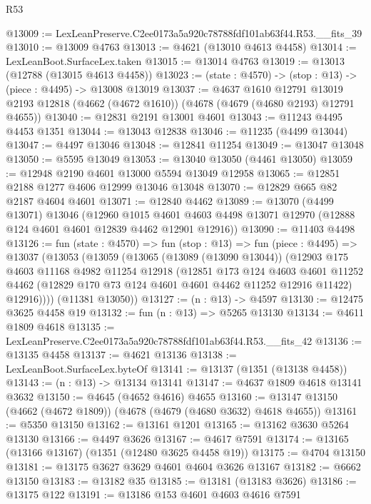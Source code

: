 \begin{lexlean}{R53}
\begin{coremodule}
@13009 := LexLeanPreserve.C2ee0173a5a920c78788fdf101ab63f44.R53.__fits_39
@13010 := @13009 @4763
@13013 := @4621 (@13010 @4613 @4458)
@13014 := LexLeanBoot.SurfaceLex.taken
@13015 := @13014 @4763
@13019 := @13013 (@12788 (@13015 @4613 @4458))
@13023 := (state : @4570) -> (stop : @13) -> (piece : @4495) -> @13008 @13019
@13037 := @4637
    @1610
    @12791
    @13019
    @2193
    @12818
    (@4662 (@4672 @1610))
    (@4678 (@4679 (@4680 @2193) @12791 @4655))
@13040 := @12831 @2191 @13001 @4601
@13043 := @11243 @4495 @4453 @1351
@13044 := @13043 @12838
@13046 := @11235 (@4499 @13044)
@13047 := @4497 @13046
@13048 := @12841 @11254
@13049 := @13047 @13048
@13050 := @5595 @13049
@13053 := @13040 @13050 (@4461 @13050)
@13059 := @12948 @2190 @4601 @13000 @5594 @13049 @12958
@13065 := @12851 @2188 @1277 @4606 @12999 @13046 @13048
@13070 := @12829 @665 @82 @2187 @4604 @4601
@13071 := @12840 @4462
@13089 := @13070
    (@4499 @13071)
    @13046
    (@12960
      @1015
      @4601
      @4603
      @4498
      @13071
      @12970
      (@12888 @124 @4601 @4601 @12839 @4462 @12901 @12916))
@13090 := @11403 @4498
@13126 := fun (state : @4570) =>
  fun (stop : @13) =>
  fun (piece : @4495) =>
  @13037
    (@13053
      (@13059
        (@13065
          (@13089 (@13090 @13044))
          (@12903
            @175
            @4603
            @11168
            @4982
            @11254
            @12918
            (@12851
              @173
              @124
              @4603
              @4601
              @11252
              @4462
              (@12829 @170 @73 @124 @4601 @4601 @4462 @11252 @12916 @11422)
              @12916))))
      (@11381 @13050))
@13127 := (n : @13) -> @4597
@13130 := @12475 @3625 @4458 @19
@13132 := fun (n : @13) => @5265 @13130
@13134 := @4611 @1809 @4618
@13135 := LexLeanPreserve.C2ee0173a5a920c78788fdf101ab63f44.R53.__fits_42
@13136 := @13135 @4458
@13137 := @4621 @13136
@13138 := LexLeanBoot.SurfaceLex.byteOf
@13141 := @13137 (@1351 (@13138 @4458))
@13143 := (n : @13) -> @13134 @13141
@13147 := @4637 @1809 @4618 @13141 @3632
@13150 := @4645 (@4652 @4616) @4655
@13160 := @13147 @13150 (@4662 (@4672 @1809)) (@4678 (@4679 (@4680 @3632) @4618 @4655))
@13161 := @5350 @13150
@13162 := @13161 @1201
@13165 := @13162 @3630 @5264 @13130
@13166 := @4497 @3626
@13167 := @4617 @7591
@13174 := @13165 (@13166 @13167) (@1351 (@12480 @3625 @4458 @19))
@13175 := @4704 @13150
@13181 := @13175 @3627 @3629 @4601 @4604 @3626 @13167
@13182 := @6662 @13150
@13183 := @13182 @35
@13185 := @13181 (@13183 @3626)
@13186 := @13175 @122
@13191 := @13186 @153 @4601 @4603 @4616 @7591

\end{coremodule}
\end{lexlean}
